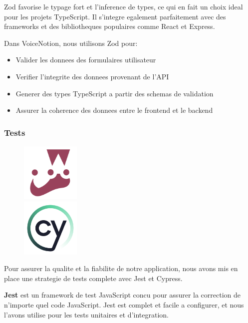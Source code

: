 Zod favorise le typage fort et l'inference de types, ce qui en fait un choix ideal pour les projets TypeScript. Il s'integre egalement parfaitement avec des frameworks et des bibliotheques populaires comme React et Express. 

Dans VoiceNotion, nous utilisons Zod pour:
\begin{itemize}
    \item Valider les donnees des formulaires utilisateur
    \item Verifier l'integrite des donnees provenant de l'API
    \item Generer des types TypeScript a partir des schemas de validation
    \item Assurer la coherence des donnees entre le frontend et le backend
\end{itemize}

\subsubsection{Tests}
\begin{figure}
    \centering
    \includegraphics[width=0.25\textwidth]{assets/docs/jest.png}\\
    \vspace{0.5cm}
    \includegraphics[width=0.25\textwidth]{assets/docs/cypress.png}
\end{figure}
Pour assurer la qualite et la fiabilite de notre application, nous avons mis en place une strategie de tests complete avec Jest et Cypress.

\textbf{Jest} est un framework de test JavaScript concu pour assurer la correction de n'importe quel code JavaScript. Jest est complet et facile a configurer, et nous l'avons utilise pour les tests unitaires et d'integration.

